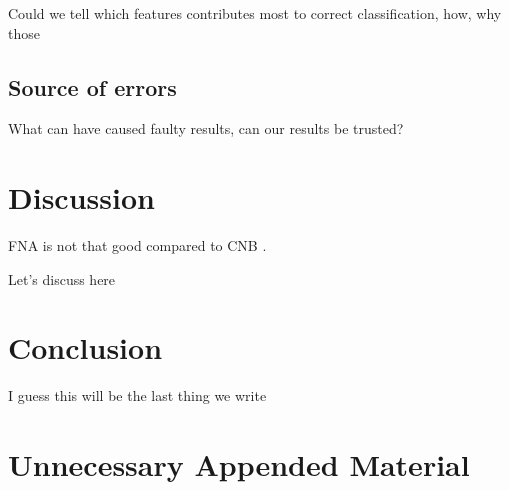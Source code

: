 \documentclass{kththesis}
\begin{document}
Could we tell which features contributes most to correct classification, how, why those

\section{Source of errors}

What can have caused faulty results, can our results be trusted?

\chapter{Discussion}

FNA is not that good compared to CNB \parencite{Topps2018}.

Let's discuss here

\chapter{Conclusion}

I guess this will be the last thing we write

\printbibliography[heading=bibintoc] %

\appendix

\chapter{Unnecessary Appended Material}
\end{document}
